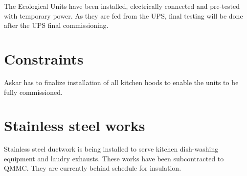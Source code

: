 The Ecological Units have been installed,  electrically connected and pre-tested with temporary power. As they are fed from the UPS, final testing will be done after the UPS final commissioning.  

\section{Constraints}

Askar has to finalize installation of all kitchen hoods to enable the units to be fully commissioned.

\newenvironment{activitytable}{
\begin{longtable}{@{} c  l  l  l l  l l  p{3cm} }
\toprule
Floor/Activity &\textcircled{1}&\textcircled{2}
                   &\textcircled{3}&\textcircled{4}
                   &\textcircled{5}&\WIR &Remarks\\
\midrule}{%
\bottomrule
\end{longtable}}

\section{Stainless steel works}

Stainless steel ductwork is being installed to serve kitchen dish-washing equipment and laudry exhausts. 
These works have been subcontracted to QMMC. They are currently behind schedule for insulation. 


